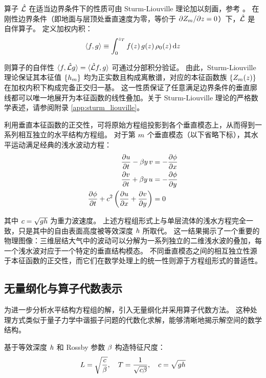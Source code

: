 算子 $\hat{\mathcal{L}}$ 在适当边界条件下的性质可由 Sturm-Liouville 理论加以刻画，参考 \citep{Magnus2023}。
在刚性边界条件（即地面与层顶处垂直速度为零，等价于 $\partial Z_m/\partial z = 0$）下，$\hat{\mathcal{L}}$ 是自伴算子。
定义加权内积：
\begin{equation}
    \langle f, g \rangle \equiv \int_0^{z_T} f(z)\, g(z)\, \rho_0(z)\, \mathrm{d}z
    \label{eq:inner_product}
\end{equation}

则算子的自伴性 $\langle f, \hat{\mathcal{L}} g \rangle = \langle \hat{\mathcal{L}} f, g \rangle$ 可通过分部积分验证。
由此，Sturm-Liouville 理论保证其本征值 $\{h_m\}$ 均为正实数且构成离散谱，对应的本征函数族 $\{Z_m(z)\}$ 在加权内积下构成完备正交归一基。
这一性质保证了任意满足边界条件的垂直廓线都可以唯一地展开为本征函数的线性叠加。关于 Sturm-Liouville 理论的严格数学表述，请参阅附录 \ref{app:sturm_liouville}。

利用垂直本征函数的正交性，可将原始方程组投影到各个垂直模态上，从而得到一系列相互独立的水平结构方程组。
对于第 $m$ 个垂直模态（以下省略下标），其水平运动满足经典的浅水波动方程：
\begin{align}
    \pde{u}{\timevar} - \rossby y\, v &= -\pde{\gravpotential}{x} \label{eq:swe_u}\\
    \pde{v}{\timevar} + \rossby y\, u &= -\pde{\gravpotential}{y} \label{eq:swe_v}\\
    \pde{\gravpotential}{\timevar} + \ceq^2\left(\pde{u}{x} + \pde{v}{y}\right) &= 0 \label{eq:swe_phi}
\end{align}

其中 $c = \sqrt{g h}$ 为重力波速度。
上述方程组形式上与单层流体的浅水方程完全一致，只是其中的自由表面高度被等效深度 $h$ 所取代。
这一结果揭示了一个重要的物理图像：三维层结大气中的波动可以分解为一系列独立的二维浅水波的叠加，每一个浅水波对应于一个特定的垂直结构模态。
不同垂直模态之间的相互独立性源于本征函数的正交性，而它们在数学处理上的统一性则源于方程组形式的普适性。

\subsection{无量纲化与算子代数表示}
\label{subsec:operator_algebra}

为进一步分析水平结构方程组的解，引入无量纲化并采用算子代数方法。
这种处理方式类似于量子力学中谐振子问题的代数化求解，能够清晰地揭示解空间的数学结构。

基于等效深度 $h$ 和 Rossby 参数 $\beta$ 构造特征尺度：
\begin{equation}
    L = \sqrt{\frac{c}{\beta}}, \quad T = \frac{1}{\sqrt{c\beta}}, \quad c = \sqrt{gh}
    \label{eq:natural_scales}
\end{equation}

